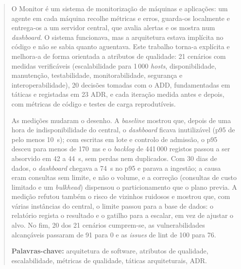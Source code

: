 \begin{abstract}
O Monitor é um sistema de monitorização de máquinas e aplicações: um agente em cada máquina recolhe métricas
e erros, guarda-os localmente e entrega-os a um servidor central, que avalia alertas e os mostra num
\emph{dashboard}. O sistema funcionava, mas a arquitetura estava implícita no código e não se sabia quanto
aguentava. Este trabalho torna-a explícita e melhora-a de forma orientada a atributos de qualidade: 21 cenários
com medidas verificáveis (escalabilidade para 1\,000 \emph{hosts}, disponibilidade, manutenção, testabilidade,
monitorabilidade, segurança e interoperabilidade), 20 decisões tomadas com o ADD, fundamentadas em táticas e
registadas em 23 ADR, e cada iteração medida antes e depois, com métricas de código e testes de carga
reprodutíveis.

As medições mudaram o desenho. A \emph{baseline} mostrou que, depois de uma hora de indisponibilidade do
central, o \emph{dashboard} ficava inutilizável (p95 de pelo menos 10~s); com escritas em lote e controlo de
admissão, o p95 desceu para menos de 170~ms e o \emph{backlog} de 441\,000 registos passou a ser absorvido em 42 a 44~s, sem
perdas nem duplicados. Com 30 dias de dados, o \emph{dashboard} chegava a 74~s no p95 e parava a ingestão;
a causa eram consultas sem limite, e não o volume, e a correção (consultas de custo limitado e um
\emph{bulkhead}) dispensou o particionamento que o plano previa. A medição refutou também o risco de vizinhos
ruidosos e mostrou que, com várias instâncias do central, o limite passou para a base de dados: o relatório
regista o resultado e o gatilho para a escalar, em vez de ajustar o alvo. No fim, 20 dos 21 cenários
cumprem-se, as vulnerabilidades alcançáveis passaram de 91 para 0 e as \emph{issues} de lint de 100 para 76.

\medskip
\noindent\textbf{Palavras-chave:} arquitetura de software, atributos de qualidade, escalabilidade,
métricas de qualidade, táticas arquiteturais, ADR.
\end{abstract}
